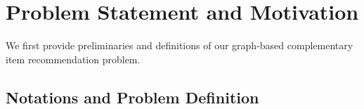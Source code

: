 \documentclass[letterpaper]{article} %
\newtheorem{definition}{Definition}
\begin{document}

\section{Problem Statement and Motivation}
We first provide preliminaries and definitions of our graph-based complementary item recommendation problem. 

\subsection{Notations and Problem Definition}
\label{sec:preliminaey_study}


\end{document}
